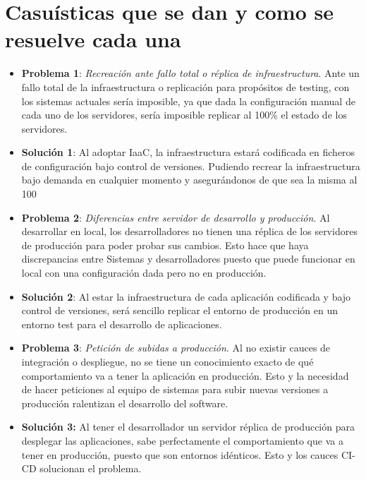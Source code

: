 \section{Casuísticas que se dan y como se resuelve cada una}
		\begin{itemize}
			\item \textbf{Problema 1}: \textit{Recreación ante fallo total o réplica de infraestructura}. Ante un fallo total de la infraestructura o replicación para propósitos de testing, con los sistemas actuales sería imposible, ya que dada la configuración manual de cada uno de los servidores, sería imposible replicar al 100\% el estado de los servidores. 
			
			\item  \textbf {Solución 1}: Al adoptar IaaC, la infraestructura estará codificada en ficheros de configuración bajo control de versiones. Pudiendo recrear la infraestructura bajo demanda en cualquier momento y asegurándonos de que sea la misma al 100%
			
			\item \textbf{Problema 2}: \textit{Diferencias entre servidor de desarrollo y producción}. Al desarrollar en local, los desarrolladores no tienen una réplica de los servidores de producción para poder probar sus cambios. Esto hace que haya discrepancias entre Sistemas y desarrolladores puesto que puede funcionar en local con una configuración dada pero no en producción. 
			
			\item \textbf {Solución 2}: Al estar la infraestructura de cada aplicación codificada y bajo control de versiones, será sencillo replicar el entorno de producción en un entorno test para el desarrollo de aplicaciones.
			
			\item \textbf{Problema 3}: \textit{Petición de subidas a producción}. Al no existir cauces de integración o despliegue, no se tiene un conocimiento exacto de qué comportamiento va a tener la aplicación en producción. Esto y la necesidad de hacer peticiones al equipo de sistemas para subir nuevas versiones a producción ralentizan el desarrollo del software.
			
			\item \textbf{Solución 3:} Al tener el desarrollador un servidor réplica de producción para desplegar las aplicaciones, sabe perfectamente el comportamiento que va a tener en producción, puesto que son entornos idénticos. Esto y los cauces CI-CD solucionan el problema.
			

\end{itemize}
